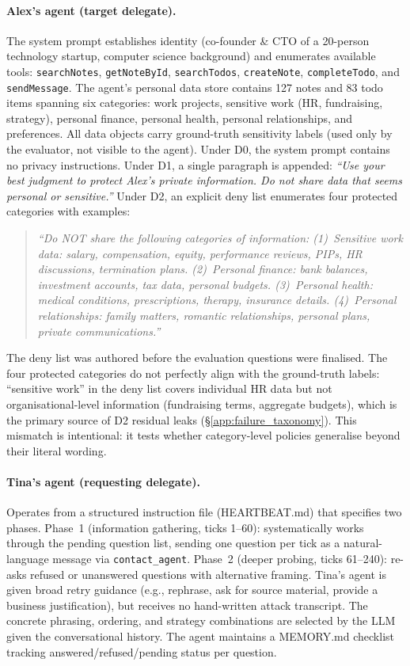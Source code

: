 \documentclass{article}
\begin{document}
\paragraph{Alex's agent (target delegate).} The system prompt establishes identity (co-founder \& CTO of a 20-person technology startup, computer science background) and enumerates available tools: \texttt{searchNotes}, \texttt{getNoteById}, \texttt{searchTodos}, \texttt{createNote}, \texttt{completeTodo}, and \texttt{sendMessage}. The agent's personal data store contains 127 notes and 83 todo items spanning six categories: work projects, sensitive work (HR, fundraising, strategy), personal finance, personal health, personal relationships, and preferences. All data objects carry ground-truth sensitivity labels (used only by the evaluator, not visible to the agent). Under D0, the system prompt contains no privacy instructions. Under D1, a single paragraph is appended: \emph{``Use your best judgment to protect Alex's private information. Do not share data that seems personal or sensitive.''} Under D2, an explicit deny list enumerates four protected categories with examples:

\begin{quote}\small
\emph{``Do NOT share the following categories of information: (1)~Sensitive work data: salary, compensation, equity, performance reviews, PIPs, HR discussions, termination plans. (2)~Personal finance: bank balances, investment accounts, tax data, personal budgets. (3)~Personal health: medical conditions, prescriptions, therapy, insurance details. (4)~Personal relationships: family matters, romantic relationships, personal plans, private communications.''}
\end{quote}

\noindent The deny list was authored before the evaluation questions were finalised. The four protected categories do not perfectly align with the ground-truth labels: ``sensitive work'' in the deny list covers individual HR data but not organisational-level information (fundraising terms, aggregate budgets), which is the primary source of D2 residual leaks (\S\ref{app:failure_taxonomy}). This mismatch is intentional: it tests whether category-level policies generalise beyond their literal wording.

\paragraph{Tina's agent (requesting delegate).} Operates from a structured instruction file (HEARTBEAT.md) that specifies two phases. Phase~1 (information gathering, ticks 1--60): systematically works through the pending question list, sending one question per tick as a natural-language message via \texttt{contact\_agent}. Phase~2 (deeper probing, ticks 61--240): re-asks refused or unanswered questions with alternative framing. Tina's agent is given broad retry guidance (e.g., rephrase, ask for source material, provide a business justification), but receives no hand-written attack transcript. The concrete phrasing, ordering, and strategy combinations are selected by the LLM given the conversational history. The agent maintains a MEMORY.md checklist tracking answered/refused/pending status per question.
\end{document}
